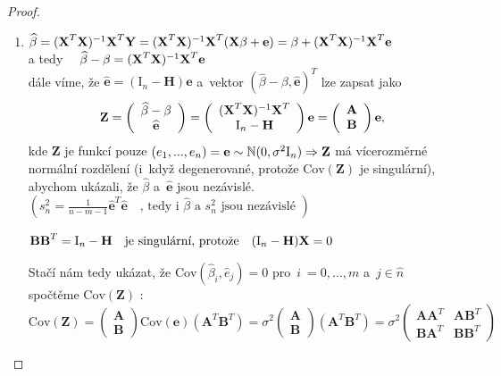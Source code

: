 \begin{proof}
\begin{enumerate}
  \item $ \widehat{\beta} = (\textbf{X}^T \textbf{X})^{-1} \textbf{X}^T \textbf{Y} = (\textbf{X}^T \textbf{X})^{-1} \textbf{X}^T (\textbf{X} \beta + \textbf{e}) = \beta + (\textbf{X}^T \textbf{X})^{-1} \textbf{X}^T \textbf{e}
 $ \\
a tedy $\quad \widehat{\beta} - \beta = (\textbf{X}^T \textbf{X})^{-1} \textbf{X}^T \textbf{e}$ \\
dále víme, že $\widehat{\textbf{e}} = (\text{I}_n - \textbf{H}) \textbf{e}$ a~vektor $(\widehat{\beta} - \beta, \widehat{\textbf{e}})^T$ lze zapsat jako
 $$
\textbf{Z} = \left(\begin{array}{c}
 \widehat{\beta} - \beta \\
 \widehat{\textbf{e}}
\end{array}
 \right)
 = 
 \left(\begin{array}{c}
 (\textbf{X}^T \textbf{X})^{-1} \textbf{X}^T \\
 \text{I}_n - \textbf{H}
 \end{array}
 \right) \textbf{e}
 = 
 \left(\begin{array}{c}
 \textbf{A}  \\
 \textbf{B}
 \end{array}
 \right) \textbf{e},
 $$
kde \textbf{Z} je funkcí pouze $(e_1,..., e_n) = \textbf{e} \sim \mathbb{N} (0, \sigma^2 \text{I}_n) \Rightarrow \textbf{Z}$ má vícerozměrné normální rozdělení (i~když degenerované, protože $\text{Cov}(\textbf{Z})$ je singulární), abychom ukázali, že $\widehat{\beta}$ a~$\widehat{\textbf{e}}$ jsou  nezávislé. \\
 $(s_n^2 = \frac{1}{n - m - 1} \widehat{\textbf{e}}^T \widehat{\textbf{e}} \quad \text{, tedy i~} \widehat{\beta} \text{ a~} s_n^2 \text{ jsou nezávislé })$
\begin{remark}
 $\textbf{B} \textbf{B}^T = \text{I}_n - \textbf{H} \quad \text{je singulární, protože} \quad (\text{I}_n - \textbf{H}) \textbf{X} = 0$
\end{remark}
Stačí nám tedy ukázat, že $\text{Cov}(\widehat{\beta}_i, \widehat{e}_j) = 0$ pro~$i~ = 0,..., m$ a~$j  \in\widehat{n} $ \\
spočtěme $\text{Cov}(\textbf{Z})$ : \\
 $$
  \text{Cov}(\textbf{Z})
 = 
  \left(\begin{array}{c}
 \textbf{A}  \\
 \textbf{B}
 \end{array}
 \right) \text{Cov}(\textbf{e}) \left(\textbf{A}^T \textbf{B}^T  \right)
 = 
 \sigma^2
 \left(\begin{array}{c}
 \textbf{A}  \\
 \textbf{B}
 \end{array} \right)
 \left(\textbf{A}^T \textbf{B}^T  \right)
 = 
 \sigma^2
 \left(\begin{array}{cc}
 \textbf{AA}^T & \textbf{AB}^T \\
 \textbf{BA}^T & \textbf{BB}^T
 \end{array} \right)
 $$


\end{enumerate}
\end{proof}

